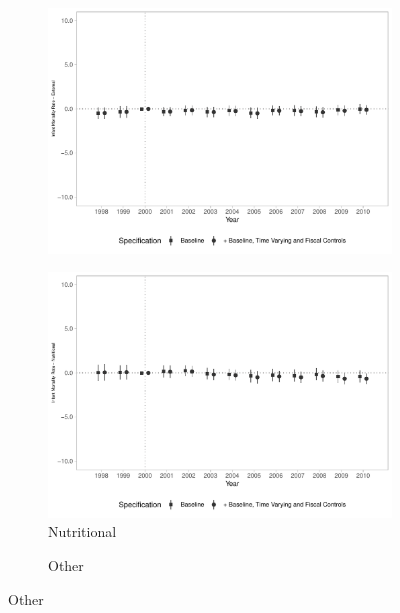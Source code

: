 \begin{figure}[h!]
\begin{center}
\begin{subfigure}{0.32\textwidth}
        \includegraphics[width=\textwidth]{plots/tx_mi_ext_dist_ec29_baseline_dist_ec29_baseline_17.pdf}
    \end{subfigure}
        \begin{subfigure}{0.32\textwidth}
        \centering
        \caption{\scriptsize Nutritional}\label{fig:17f}
        \includegraphics[width=\textwidth]{plots/tx_mi_nut_dist_ec29_baseline_dist_ec29_baseline_17.pdf}
    \end{subfigure}
        \begin{subfigure}{0.32\textwidth}
        \centering
        \caption{\scriptsize Other}\label{fig:17g}

\end{subfigure}
\end{center}
\end{figure}
